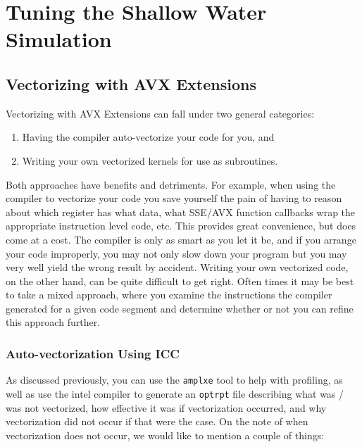 
\section{Tuning the Shallow Water Simulation}
\label{sec-tune}


\subsection{Vectorizing with AVX Extensions}
\label{sec-tune-vectorizing}

\noindent Vectorizing with AVX Extensions can fall under two general categories:

\begin{enumerate}[1.]
    \item Having the compiler auto-vectorize your code for you, and
    \item Writing your own vectorized kernels for use as subroutines.
\end{enumerate}

Both approaches have benefits and detriments.  For example, when using the compiler to vectorize your code you save yourself the pain of having to reason about which register has what data, what SSE/AVX function callbacks wrap the appropriate instruction level code, etc.  This provides great convenience, but does come at a cost.  The compiler is only as smart as you let it be, and if you arrange your code improperly, you may not only slow down your program but you may very well yield the wrong result by accident.  Writing your own vectorized code, on the other hand, can be quite difficult to get right.  Often times it may be best to take a mixed approach, where you examine the instructions the compiler generated for a given code segment and determine whether or not you can refine this approach further.

\subsubsection{Auto-vectorization Using ICC}
\label{sec-tune-vectorizing-auto-vectorizing}

As discussed previously, you can use the \texttt{amplxe} tool to help with profiling, as well as use the intel compiler to generate an \texttt{optrpt} file describing what was / was not vectorized, how effective it was if vectorization occurred, and why vectorization did not occur if that were the case.  On the note of when vectorization does not occur, we would like to mention a couple of things:

